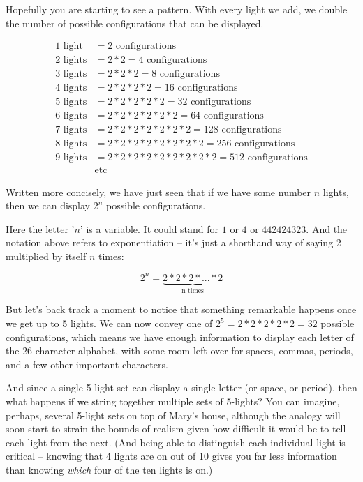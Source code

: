 \documentclass{book}
\begin{document}
Hopefully you are starting to see a pattern. With every light we add, we double the number of possible configurations that can be displayed.

\begin{align*}
1 \text{ light} &= 2 \text{ configurations} \\
2 \text{ lights} &= 2*2 = 4 \text{ configurations} \\
3 \text{ lights} &= 2*2*2 = 8 \text{ configurations} \\
4 \text{ lights} &= 2*2*2*2 = 16 \text{ configurations} \\
5 \text{ lights} &= 2*2*2*2*2 = 32 \text{ configurations} \\
6 \text{ lights} &= 2*2*2*2*2*2 = 64 \text{ configurations} \\
7 \text{ lights} &= 2*2*2*2*2*2*2 = 128 \text{ configurations} \\
8 \text{ lights} &= 2*2*2*2*2*2*2*2 = 256 \text{ configurations} \\
9 \text{ lights} &= 2*2*2*2*2*2*2*2*2 = 512 \text{ configurations} \\
&\text{etc}
\end{align*}

Written more concisely, we have just seen that if we have some number $n$ lights, then we can display $2^n$ possible configurations.

Here the letter '$n$' is a variable. It could stand for $1$ or $4$ or $442424323$. And the notation above refers to exponentiation -- it's just a shorthand way of saying 2 multiplied by itself $n$ times:

\[ 2^n = \underbrace{2*2*2*...* 2}_{\text{n times}}\]

But let's back track a moment to notice that something remarkable happens once we get up to 5 lights. We can now convey one of $2^5 = 2*2*2*2*2 = 32$ possible configurations, which means we have enough information to display each letter of the 26-character alphabet, with some room left over for spaces, commas, periods, and a few other important characters.

And since a single 5-light set can display a single letter (or space, or period), then what happens if we string together multiple sets of 5-lights? You can imagine, perhaps, several 5-light sets on top of Mary's house, although the analogy will soon start to strain the bounds of realism given how difficult it would be to tell each light from the next. (And being able to distinguish each individual light is critical -- knowing that 4 lights are on out of 10 gives you far less information than knowing \emph{which} four of the ten lights is on.)
\end{document}
